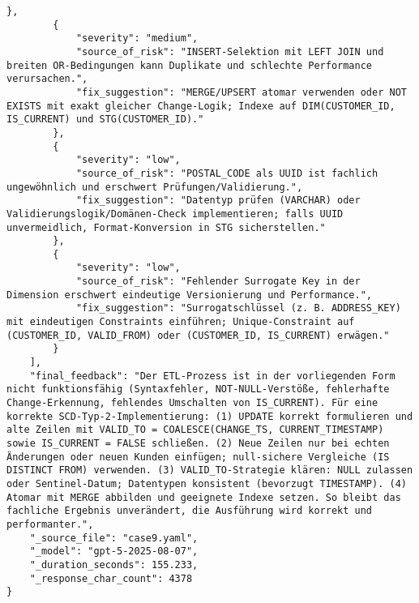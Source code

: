 \begin{lstlisting}[caption={Ausgabe: GPT-5 Anwendungsfall 9 Robustheitsdurchlauf},label={gpt_case9_prompt3}]
        },
        {
            "severity": "medium",
            "source_of_risk": "INSERT-Selektion mit LEFT JOIN und breiten OR-Bedingungen kann Duplikate und schlechte Performance verursachen.",
            "fix_suggestion": "MERGE/UPSERT atomar verwenden oder NOT EXISTS mit exakt gleicher Change-Logik; Indexe auf DIM(CUSTOMER_ID, IS_CURRENT) und STG(CUSTOMER_ID)."
        },
        {
            "severity": "low",
            "source_of_risk": "POSTAL_CODE als UUID ist fachlich ungewöhnlich und erschwert Prüfungen/Validierung.",
            "fix_suggestion": "Datentyp prüfen (VARCHAR) oder Validierungslogik/Domänen-Check implementieren; falls UUID unvermeidlich, Format-Konversion in STG sicherstellen."
        },
        {
            "severity": "low",
            "source_of_risk": "Fehlender Surrogate Key in der Dimension erschwert eindeutige Versionierung und Performance.",
            "fix_suggestion": "Surrogatschlüssel (z. B. ADDRESS_KEY) mit eindeutigen Constraints einführen; Unique-Constraint auf (CUSTOMER_ID, VALID_FROM) oder (CUSTOMER_ID, IS_CURRENT) erwägen."
        }
    ],
    "final_feedback": "Der ETL-Prozess ist in der vorliegenden Form nicht funktionsfähig (Syntaxfehler, NOT-NULL-Verstöße, fehlerhafte Change-Erkennung, fehlendes Umschalten von IS_CURRENT). Für eine korrekte SCD-Typ-2-Implementierung: (1) UPDATE korrekt formulieren und alte Zeilen mit VALID_TO = COALESCE(CHANGE_TS, CURRENT_TIMESTAMP) sowie IS_CURRENT = FALSE schließen. (2) Neue Zeilen nur bei echten Änderungen oder neuen Kunden einfügen; null-sichere Vergleiche (IS DISTINCT FROM) verwenden. (3) VALID_TO-Strategie klären: NULL zulassen oder Sentinel-Datum; Datentypen konsistent (bevorzugt TIMESTAMP). (4) Atomar mit MERGE abbilden und geeignete Indexe setzen. So bleibt das fachliche Ergebnis unverändert, die Ausführung wird korrekt und performanter.",
    "_source_file": "case9.yaml",
    "_model": "gpt-5-2025-08-07",
    "_duration_seconds": 155.233,
    "_response_char_count": 4378
}
\end{lstlisting}

